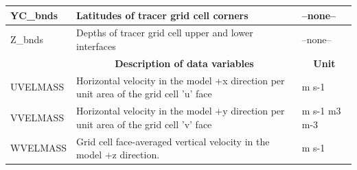 \begin{longtable}{|m{}|m{}|m{}|}
YC\_bnds &Latitudes of tracer grid cell corners &--none--  \\ \hline
Z\_bnds &Depths of tracer grid cell upper and lower interfaces &--none--  \\ \hline
\rowcolor{lightgray} \multicolumn{1}{|c|}{\textbf{Variables}} & \multicolumn{1}{|c|}{\textbf{Description of data variables}} &  \multicolumn{1}{|c|}{\textbf{Unit}}\\ \hline
UVELMASS &Horizontal velocity in the model +x direction per unit area of the grid cell 'u' face &m s-1  \\ \hline
VVELMASS &Horizontal velocity in the model +y direction per unit area of the grid cell 'v' face &m s-1 m3 m-3  \\ \hline
WVELMASS &Grid cell face-averaged vertical velocity in the model +z direction. &m s-1  \\ \hline
\end{longtable}

\newp
\pagebreak
